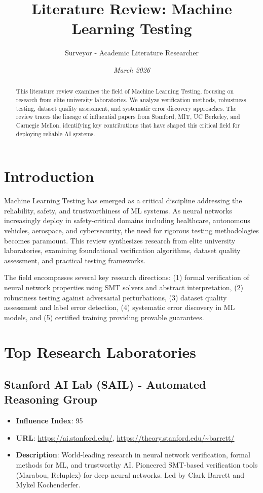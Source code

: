 \documentclass[12pt,a4paper]{article}
\title{\textbf{Literature Review: Machine Learning Testing}}
\author{Surveyor - Academic Literature Researcher}
\date{\textit{March 2026}}
\begin{document}
\maketitle

\begin{abstract}
This literature review examines the field of Machine Learning Testing, focusing on research from elite university laboratories. We analyze verification methods, robustness testing, dataset quality assessment, and systematic error discovery approaches. The review traces the lineage of influential papers from Stanford, MIT, UC Berkeley, and Carnegie Mellon, identifying key contributions that have shaped this critical field for deploying reliable AI systems.
\end{abstract}

\section{Introduction}

Machine Learning Testing has emerged as a critical discipline addressing the reliability, safety, and trustworthiness of ML systems. As neural networks increasingly deploy in safety-critical domains including healthcare, autonomous vehicles, aerospace, and cybersecurity, the need for rigorous testing methodologies becomes paramount. This review synthesizes research from elite university laboratories, examining foundational verification algorithms, dataset quality assessment, and practical testing frameworks.

The field encompasses several key research directions: (1) formal verification of neural network properties using SMT solvers and abstract interpretation, (2) robustness testing against adversarial perturbations, (3) dataset quality assessment and label error detection, (4) systematic error discovery in ML models, and (5) certified training providing provable guarantees.

\section{Top Research Laboratories}

\subsection{Stanford AI Lab (SAIL) - Automated Reasoning Group}

\begin{itemize}
\item \textbf{Influence Index}: 95
\item \textbf{URL}: \url{https://ai.stanford.edu/}, \url{https://theory.stanford.edu/~barrett/}
\item \textbf{Description}: World-leading research in neural network verification, formal methods for ML, and trustworthy AI. Pioneered SMT-based verification tools (Marabou, Reluplex) for deep neural networks. Led by Clark Barrett and Mykel Kochenderfer.
\end{itemize}
\end{document}
